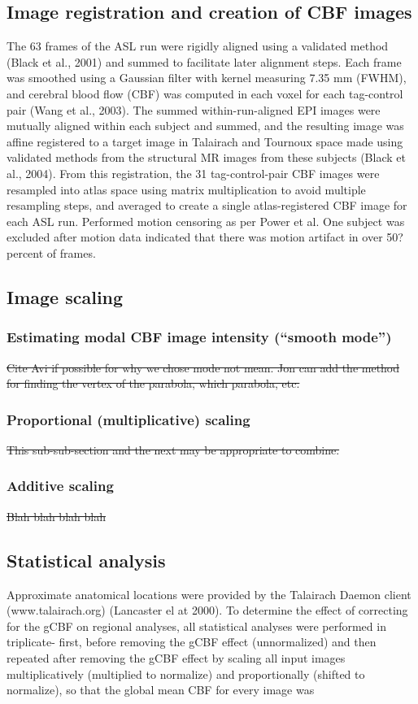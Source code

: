 \subsection{Image registration and creation of CBF images}
The 63 frames of the ASL run were rigidly aligned using a validated method (Black et al., 2001) and summed to facilitate later alignment steps. Each frame was smoothed using a Gaussian filter with kernel measuring 7.35 mm (FWHM), and cerebral blood flow (CBF) was computed in each voxel for each tag-control pair (Wang et al., 2003). The summed within-run-aligned EPI images were mutually aligned within each subject and summed, and the resulting image was affine registered to a target image in Talairach and Tournoux space made using validated methods from the structural MR images from these subjects (Black et al., 2004). From this registration, the 31 tag-control-pair CBF images were resampled into atlas space using matrix multiplication to avoid multiple resampling steps, and averaged to create a single atlas-registered CBF image for each ASL run. 
Performed motion censoring as per Power et al. One subject was excluded after motion data indicated that there was motion artifact in over 50? percent of frames.

\subsection{Image scaling}
\subsubsection{Estimating modal CBF image intensity (``smooth mode'')}
\sout{Cite Avi if possible for why we chose mode not mean. Jon can add the method for finding the vertex of the parabola, which parabola, etc.} 
\subsubsection{Proportional (multiplicative) scaling}
\sout{This sub-sub-section and the next may be appropriate to combine.}
\subsubsection{Additive scaling}
\sout{Blah blah blah blah}

\subsection{Statistical analysis}
Approximate anatomical locations were provided by the Talairach Daemon client (www.talairach.org) (Lancaster el at 2000). 
To determine the effect of correcting for the gCBF on regional analyses, all statistical analyses were performed in triplicate- first, before removing the gCBF effect (unnormalized) and then repeated after removing the gCBF effect by scaling all input images multiplicatively (multiplied to normalize) and proportionally (shifted to normalize), so that the global mean CBF for every image was 


